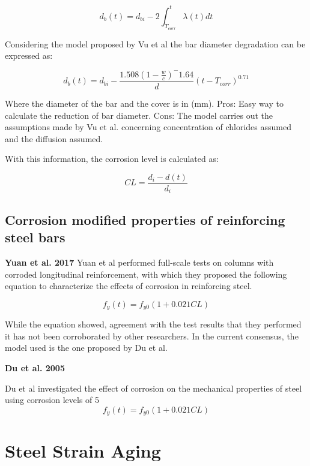\begin{equation}
	d_{b}(t)=d_{bi}-2\int_{T_{corr}}^{t} \lambda(t) dt
\end{equation}

Considering the model proposed by Vu et al the bar diameter degradation can be expressed as:

\begin{equation}
	d_{b}(t)=d_{bi}-\frac{1.508(1-\frac{w}{c})^-1.64}{d}(t-T_{corr})^0.71
\end{equation}

Where the diameter of the bar and the cover is in (mm).
Pros:
Easy way to calculate the reduction of bar diameter.
Cons:
The model carries out the assumptions made by Vu et al. concerning concentration of chlorides assumed and the diffusion assumed.

With this information, the corrosion level is calculated as:

\begin{equation}
	CL=\frac{d_{i}-d(t)}{d_{i}}
\end{equation}

\subsection{Corrosion modified properties of reinforcing steel bars}
\:
\textbf{Yuan et al. 2017}
\:
Yuan et al performed full-scale tests on columns with corroded longitudinal reinforcement, with which they proposed the following equation to characterize the effects of corrosion in reinforcing steel.

\begin{equation}
	f_{y}(t)=f_{y0}(1+0.021CL)
\end{equation}

While the equation showed, agreement with the test results that they performed it has not been corroborated by other researchers. In the current consensus, the model used is the one proposed by Du et al.


\textbf{Du et al. 2005}

Du et al investigated the effect of corrosion on the mechanical properties of steel using corrosion levels of 5%
\begin{equation}
	f_{y}(t)=f_{y0}(1+0.021CL)
\end{equation}

\section{Steel Strain Aging}

